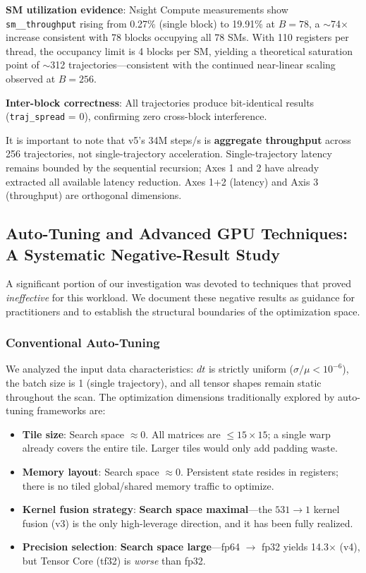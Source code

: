 \documentclass[pdflatex,sn-mathphys-num]{sn-jnl}%
\theoremstyle{thmstyleone}%
\theoremstyle{thmstyletwo}%
\theoremstyle{thmstylethree}%
\begin{document}
\textbf{SM utilization evidence}: Nsight Compute measurements show \texttt{sm\_\_throughput} rising from 0.27\% (single block) to 19.91\% at $B=78$, a $\sim$74$\times$ increase consistent with 78 blocks occupying all 78 SMs. With 110 registers per thread, the occupancy limit is 4 blocks per SM, yielding a theoretical saturation point of $\sim$312 trajectories---consistent with the continued near-linear scaling observed at $B=256$.

\textbf{Inter-block correctness}: All trajectories produce bit-identical results (\texttt{traj\_spread} = 0), confirming zero cross-block interference.

It is important to note that v5's 34M steps/s is \textbf{aggregate throughput} across 256 trajectories, not single-trajectory acceleration. Single-trajectory latency remains bounded by the sequential recursion; Axes 1 and 2 have already extracted all available latency reduction. Axes 1+2 (latency) and Axis 3 (throughput) are orthogonal dimensions.

\subsection{Auto-Tuning and Advanced GPU Techniques: A Systematic Negative-Result Study}\label{subsec:negative}

A significant portion of our investigation was devoted to techniques that proved \textit{ineffective} for this workload. We document these negative results as guidance for practitioners and to establish the structural boundaries of the optimization space.

\subsubsection{Conventional Auto-Tuning}

We analyzed the input data characteristics: $dt$ is strictly uniform ($\sigma/\mu < 10^{-6}$), the batch size is 1 (single trajectory), and all tensor shapes remain static throughout the scan. The optimization dimensions traditionally explored by auto-tuning frameworks are:

\begin{itemize}
\item \textbf{Tile size}: Search space $\approx 0$. All matrices are $\leq 15\times15$; a single warp already covers the entire tile. Larger tiles would only add padding waste.
\item \textbf{Memory layout}: Search space $\approx 0$. Persistent state resides in registers; there is no tiled global/shared memory traffic to optimize.
\item \textbf{Kernel fusion strategy}: \textbf{Search space maximal}---the $531 \rightarrow 1$ kernel fusion (v3) is the only high-leverage direction, and it has been fully realized.
\item \textbf{Precision selection}: \textbf{Search space large}---fp64 $\rightarrow$ fp32 yields 14.3$\times$ (v4), but Tensor Core (tf32) is \textit{worse} than fp32.
\end{itemize}
\end{document}
